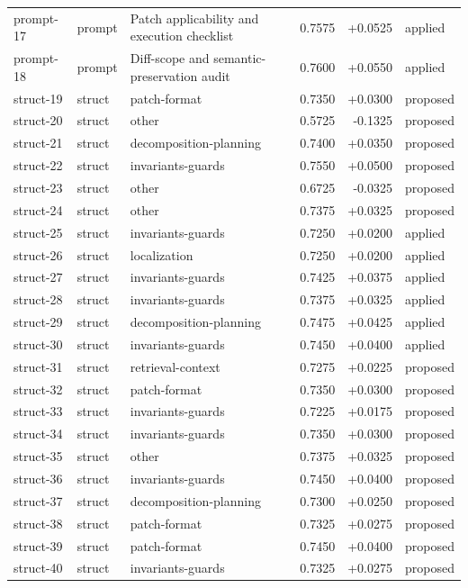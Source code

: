 \begin{center}
\begin{longtable}{llp{5.2cm}rrl}
prompt-17 & prompt & Patch applicability and execution checklist & 0.7575 & +0.0525 & applied \\
prompt-18 & prompt & Diff-scope and semantic-preservation audit & 0.7600 & +0.0550 & applied \\
struct-19 & struct & patch-format & 0.7350 & +0.0300 & proposed \\
struct-20 & struct & other & 0.5725 & -0.1325 & proposed \\
struct-21 & struct & decomposition-planning & 0.7400 & +0.0350 & proposed \\
struct-22 & struct & invariants-guards & 0.7550 & +0.0500 & proposed \\
struct-23 & struct & other & 0.6725 & -0.0325 & proposed \\
struct-24 & struct & other & 0.7375 & +0.0325 & proposed \\
struct-25 & struct & invariants-guards & 0.7250 & +0.0200 & applied \\
struct-26 & struct & localization & 0.7250 & +0.0200 & applied \\
struct-27 & struct & invariants-guards & 0.7425 & +0.0375 & applied \\
struct-28 & struct & invariants-guards & 0.7375 & +0.0325 & applied \\
struct-29 & struct & decomposition-planning & 0.7475 & +0.0425 & applied \\
struct-30 & struct & invariants-guards & 0.7450 & +0.0400 & applied \\
struct-31 & struct & retrieval-context & 0.7275 & +0.0225 & proposed \\
struct-32 & struct & patch-format & 0.7350 & +0.0300 & proposed \\
struct-33 & struct & invariants-guards & 0.7225 & +0.0175 & proposed \\
struct-34 & struct & invariants-guards & 0.7350 & +0.0300 & proposed \\
struct-35 & struct & other & 0.7375 & +0.0325 & proposed \\
struct-36 & struct & invariants-guards & 0.7450 & +0.0400 & proposed \\
struct-37 & struct & decomposition-planning & 0.7300 & +0.0250 & proposed \\
struct-38 & struct & patch-format & 0.7325 & +0.0275 & proposed \\
struct-39 & struct & patch-format & 0.7450 & +0.0400 & proposed \\
struct-40 & struct & invariants-guards & 0.7325 & +0.0275 & proposed \\

\end{longtable}
\end{center}
